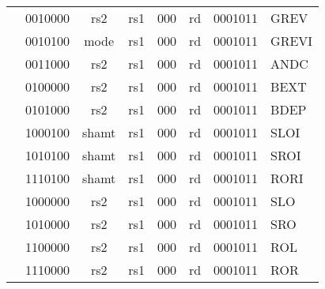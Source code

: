 \begin{table}[p]
\begin{small}
\begin{center}
\begin{tabular}{p{0in}p{0.4in}p{0.05in}p{0.05in}p{0.05in}p{0.05in}p{0.4in}p{0.6in}p{0.4in}p{0.6in}p{0.7in}l}
%
\cline{2-11} &
\multicolumn{4}{|c|}{0010000} &
\multicolumn{2}{c|}{rs2} &
\multicolumn{1}{c|}{rs1} &
\multicolumn{1}{c|}{000} &
\multicolumn{1}{c|}{rd} &
\multicolumn{1}{c|}{0001011} & GREV \\
%
\cline{2-11} &
\multicolumn{4}{|c|}{0010100} &
\multicolumn{2}{c|}{mode} &
\multicolumn{1}{c|}{rs1} &
\multicolumn{1}{c|}{000} &
\multicolumn{1}{c|}{rd} &
\multicolumn{1}{c|}{0001011} & GREVI \\
%
\cline{2-11} &
\multicolumn{4}{|c|}{0011000} &
\multicolumn{2}{c|}{rs2} &
\multicolumn{1}{c|}{rs1} &
\multicolumn{1}{c|}{000} &
\multicolumn{1}{c|}{rd} &
\multicolumn{1}{c|}{0001011} & ANDC \\
%
\cline{2-11} &
\multicolumn{4}{|c|}{0100000} &
\multicolumn{2}{c|}{rs2} &
\multicolumn{1}{c|}{rs1} &
\multicolumn{1}{c|}{000} &
\multicolumn{1}{c|}{rd} &
\multicolumn{1}{c|}{0001011} & BEXT \\
%
\cline{2-11} &
\multicolumn{4}{|c|}{0101000} &
\multicolumn{2}{c|}{rs2} &
\multicolumn{1}{c|}{rs1} &
\multicolumn{1}{c|}{000} &
\multicolumn{1}{c|}{rd} &
\multicolumn{1}{c|}{0001011} & BDEP \\
%
\cline{2-11} &
\multicolumn{4}{|c|}{1000100} &
\multicolumn{2}{c|}{shamt} &
\multicolumn{1}{c|}{rs1} &
\multicolumn{1}{c|}{000} &
\multicolumn{1}{c|}{rd} &
\multicolumn{1}{c|}{0001011} & SLOI \\
%
\cline{2-11} &
\multicolumn{4}{|c|}{1010100} &
\multicolumn{2}{c|}{shamt} &
\multicolumn{1}{c|}{rs1} &
\multicolumn{1}{c|}{000} &
\multicolumn{1}{c|}{rd} &
\multicolumn{1}{c|}{0001011} & SROI \\
%
\cline{2-11} &
\multicolumn{4}{|c|}{1110100} &
\multicolumn{2}{c|}{shamt} &
\multicolumn{1}{c|}{rs1} &
\multicolumn{1}{c|}{000} &
\multicolumn{1}{c|}{rd} &
\multicolumn{1}{c|}{0001011} & RORI \\
%
\cline{2-11} &
\multicolumn{4}{|c|}{1000000} &
\multicolumn{2}{c|}{rs2} &
\multicolumn{1}{c|}{rs1} &
\multicolumn{1}{c|}{000} &
\multicolumn{1}{c|}{rd} &
\multicolumn{1}{c|}{0001011} & SLO \\
%
\cline{2-11} &
\multicolumn{4}{|c|}{1010000} &
\multicolumn{2}{c|}{rs2} &
\multicolumn{1}{c|}{rs1} &
\multicolumn{1}{c|}{000} &
\multicolumn{1}{c|}{rd} &
\multicolumn{1}{c|}{0001011} & SRO \\
%
\cline{2-11} &
\multicolumn{4}{|c|}{1100000} &
\multicolumn{2}{c|}{rs2} &
\multicolumn{1}{c|}{rs1} &
\multicolumn{1}{c|}{000} &
\multicolumn{1}{c|}{rd} &
\multicolumn{1}{c|}{0001011} & ROL \\
%
\cline{2-11} &
\multicolumn{4}{|c|}{1110000} &
\multicolumn{2}{c|}{rs2} &
\multicolumn{1}{c|}{rs1} &
\multicolumn{1}{c|}{000} &
\multicolumn{1}{c|}{rd} &
\multicolumn{1}{c|}{0001011} & ROR \\
%
\cline{2-11}
\end{tabular}
\end{center}
\end{small}
\label{instr-table}
\end{table}

